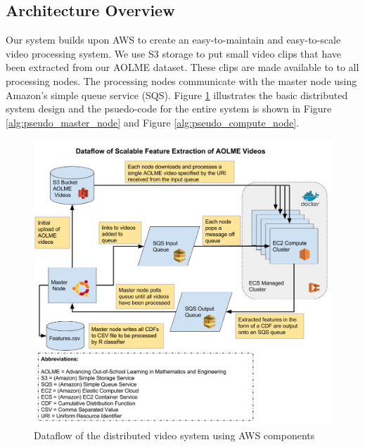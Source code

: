 \subsection{\label{subsection:architecture_overview}Architecture Overview}
Our system builds upon AWS to create an easy-to-maintain and easy-to-scale
video processing system. We use S3 storage to put small video clips that
have been extracted from our AOLME dataset. These clips are made available to
to all processing nodes. The processing nodes communicate with the master
node using Amazon's simple queue service (SQS). Figure \ref{fig:dataflow} illustrates
the basic distributed system design and the psuedo-code for the entire system
is shown in Figure \ref{alg:pseudo_master_node} and Figure \ref{alg:pseudo_compute_node}.

\begin{figure}[h]
  \centering
  \includegraphics[width=\textwidth]{figures/extract_features_dataflow}
  \caption{Dataflow of the distributed video system using AWS components}
  \label{fig:dataflow}
\end{figure}

